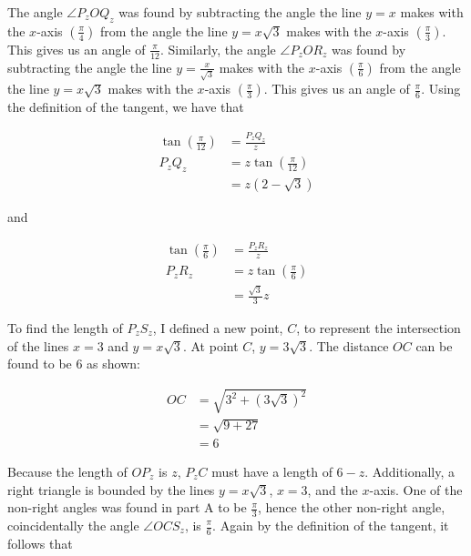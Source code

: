 \documentclass{article}
\begin{document}
    The angle $\angle P_z O Q_z$ was found by subtracting the angle the line $y=x$ makes with the $x$-axis $\left(\frac{\pi}{4}\right)$ from the angle the line $y=x\sqrt{3}$ makes with the $x$-axis
    $\left(\frac{\pi}{3}\right)$. This gives us an angle of $\frac{\pi}{12}$. Similarly, the angle $\angle P_z O R_z$ was found by subtracting the angle the line $y=\frac{x}{\sqrt{3}}$ makes with the $x$-axis
    $\left(\frac{\pi}{6}\right)$ from the angle the line $y=x\sqrt{3}$ makes with the $x$-axis $\left(\frac{\pi}{3}\right)$. This gives us an angle of $\frac{\pi}{6}$. Using the definition of the tangent, we have that

    \begin{align*}
        \tan{\left(\frac{\pi}{12}\right)}   &= \frac{P_z Q_z}{z} \\
        P_z Q_z                             &= z\tan{\left(\frac{\pi}{12}\right)} \\
                                            &= z(2-\sqrt{3})
    \end{align*}

    and

    \begin{align*}
        \tan{\left(\frac{\pi}{6}\right)} &= \frac{P_z R_z}{z} \\
        P_z R_z                          &= z\tan{\left(\frac{\pi}{6}\right)} \\
                                         &= \frac{\sqrt{3}}{3}z
    \end{align*}

    To find the length of $P_z S_z$, I defined a new point, $C$, to represent the intersection of the lines $x=3$ and $y=x\sqrt{3}$. At point $C$, $y=3\sqrt{3}$. The distance $OC$ can be found to be 6 as shown:

    \begin{align*}
        OC  &= \sqrt{3^2 + (3\sqrt{3})^2} \\
            &= \sqrt{9+27} \\
            &= 6
    \end{align*}

    Because the length of $OP_z$ is $z$, $P_z C$ must have a length of $6-z$. Additionally, a right triangle is bounded by the lines $y=x\sqrt{3}$, $x=3$, and the $x$-axis. One of the non-right angles was found in part
    A to be $\frac{\pi}{3}$, hence the other non-right angle, coincidentally the angle $\angle OC S_z$, is $\frac{\pi}{6}$. Again by the definition of the tangent, it follows that
\end{document}
